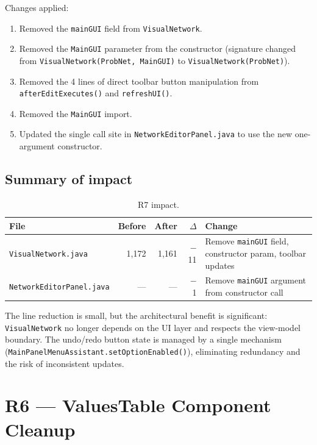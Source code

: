 \documentclass[12pt,a4paper]{article}
\newcommand{\code}[1]{\texttt{#1}}
\newcommand{\file}[1]{\texttt{#1}}
\begin{document}
Changes applied:

\begin{enumerate}
  \item Removed the \code{mainGUI} field from \code{VisualNetwork}.
  \item Removed the \code{MainGUI} parameter from the constructor
        (signature changed from \code{VisualNetwork(ProbNet, MainGUI)}
        to \code{VisualNetwork(ProbNet)}).
  \item Removed the 4 lines of direct toolbar button manipulation from
        \code{afterEditExecutes()} and \code{refreshUI()}.
  \item Removed the \code{MainGUI} import.
  \item Updated the single call site in \code{NetworkEditorPanel.java} to use
        the new one-argument constructor.
\end{enumerate}

\subsection{Summary of impact}

\begin{table}[H]
\centering
\begin{tabularx}{\textwidth}{l r r r X}
\toprule
\textbf{File} & \textbf{Before} & \textbf{After} & \textbf{$\Delta$} & \textbf{Change} \\
\midrule
\file{VisualNetwork.java} & 1{,}172 & 1{,}161 & $-$11 & Remove \code{mainGUI} field, constructor param, toolbar updates \\
\file{NetworkEditorPanel.java}  & ---     & ---     & $-$1  & Remove \code{mainGUI} argument from constructor call \\
\bottomrule
\end{tabularx}
\caption{R7 impact.}
\label{tab:r7-impact}
\end{table}

The line reduction is small, but the architectural benefit is significant:
\code{VisualNetwork} no longer depends on the UI layer and respects the
view-model boundary. The undo/redo button state is managed by a single
mechanism (\code{MainPanelMenuAssistant.setOptionEnabled()}), eliminating
redundancy and the risk of inconsistent updates.


\section{R6 --- ValuesTable Component Cleanup}
\label{sec:r6}
\end{document}
